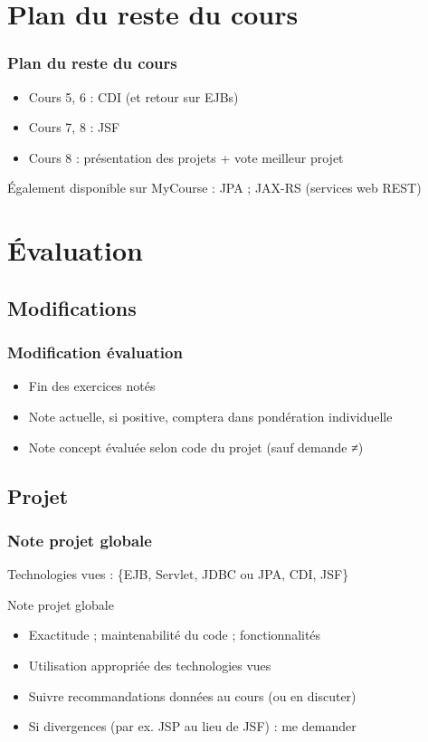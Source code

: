 \documentclass[english, french]{beamer}
\begin{document}
\section[Plan]{Plan du reste du cours}
\begin{frame}
	\frametitle{Plan du reste du cours}
	\begin{itemize}
		\item Cours 5, 6 : CDI (et retour sur EJBs)
		\item Cours 7, 8 : JSF
		\item Cours 8 : présentation des projets + vote meilleur projet
	\end{itemize}
	Également disponible sur MyCourse : JPA ; JAX-RS (services web REST)
\end{frame}

\section{Évaluation}
\subsection{Modifications}
\begin{frame}
	\frametitle{Modification évaluation}
	\begin{itemize}
		\item Fin des exercices notés
		\item Note actuelle, si positive, comptera dans pondération individuelle
		\item Note concept évaluée selon code du projet (sauf demande ≠)
	\end{itemize}
\end{frame}

\subsection{Projet}
\begin{frame}
	\frametitle{Note projet globale}
	Technologies vues : \{EJB, Servlet, JDBC ou JPA, CDI, JSF\}
	\begin{block}{Note projet globale}
		\begin{itemize}
			\item Exactitude ; maintenabilité du code ; fonctionnalités
			\item Utilisation appropriée des technologies vues
			\item Suivre recommandations données au cours (ou en discuter)
			\item Si divergences (par ex. JSP au lieu de JSF) : me demander
		\end{itemize}
	\end{block}
\end{frame}
\end{document}
